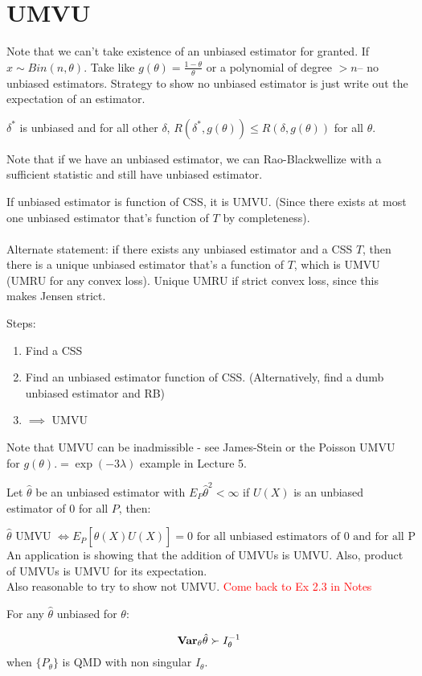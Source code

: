 \documentclass{article}
\newcommand\myworries[1]{\textcolor{red}{#1}}
\begin{document}
\section{UMVU}
Note that we can't take existence of an unbiased estimator for granted. If $x\sim Bin(n,\theta)$. Take like $g(\theta) = \frac{1-\theta}{\theta}$ or a polynomial of degree $>n$-- no unbiased estimators. Strategy to show no unbiased estimator is just write out the expectation of an estimator.
\begin{definition}[UMVU]
$\delta^*$ is unbiased and for all other $\delta$, $R(\delta^*,g(\theta)) \leq R(\delta,g(\theta))$ for all $\theta$.
\end{definition}
Note that if we have an unbiased estimator, we can Rao-Blackwellize with a sufficient statistic and still have unbiased estimator. 
\begin{theorem}
If unbiased estimator is function of CSS, it is UMVU. (Since there exists at most one unbiased estimator that's function of $T$ by completeness).\\\\
Alternate statement: if there exists any unbiased estimator and a CSS $T$, then there is a unique unbiased estimator that's a function of $T$, which is UMVU (UMRU for any convex loss). Unique UMRU if strict convex loss, since this makes Jensen strict. 

\end{theorem}
\begin{recipe}Steps:
	\begin{enumerate}
	\item Find a CSS
	\item Find an unbiased estimator function of CSS. (Alternatively, find a dumb unbiased estimator and RB)
	\item $\implies$ UMVU
\end{enumerate}
\end{recipe}
Note that UMVU can be inadmissible - see James-Stein or the Poisson UMVU for $g(\theta).= \exp(-3\lambda)$ example in Lecture 5. 
\begin{theorem}
Let $\hat \theta$ be an unbiased estimator with $E_P \hat\theta^2 <\infty$ if $U(X)$ is an unbiased estimator of $0$ for all $P$, then:

$$\hat \theta \text { UMVU } \iff E_P [\hat \theta(X) U(X) ] = 0 \text { for all unbiased estimators of } 0 \text{ and for all P}$$
An application is showing that the addition of UMVUs is UMVU. Also, product of UMVUs is UMVU for its expectation. \\
Also reasonable to try to show not UMVU. 
\myworries{Come back to Ex 2.3 in Notes}
\end{theorem}
\begin{theorem}
For any $\hat \theta$ unbiased for $\theta$:

$$\mathbf{Var}_\theta \hat \theta \succ I_\theta^{-1}$$
when $\{P_\theta\}$ is QMD with non singular $I_\theta$. 
\end{theorem}
\end{document}
